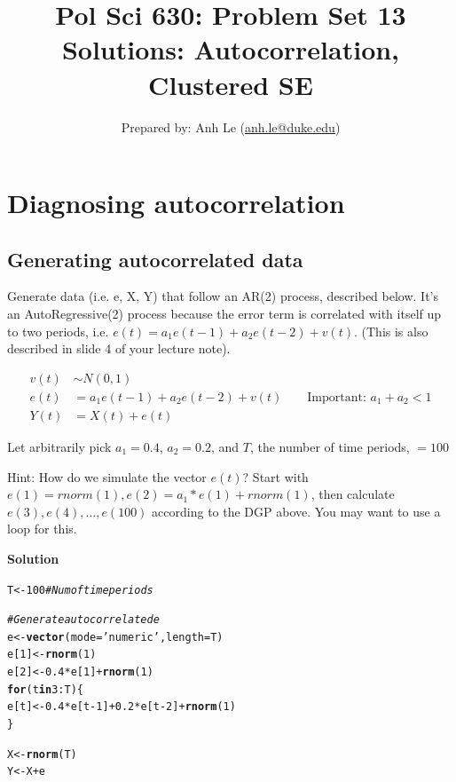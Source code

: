 \documentclass{article}\usepackage[]{graphicx}\usepackage[]{color}
\makeatletter
\newcommand{\hlnum}[1]{\textcolor[rgb]{0.686,0.059,0.569}{#1}}%
\newcommand{\hlstr}[1]{\textcolor[rgb]{0.192,0.494,0.8}{#1}}%
\newcommand{\hlcom}[1]{\textcolor[rgb]{0.678,0.584,0.686}{\textit{#1}}}%
\newcommand{\hlopt}[1]{\textcolor[rgb]{0,0,0}{#1}}%
\newcommand{\hlstd}[1]{\textcolor[rgb]{0.345,0.345,0.345}{#1}}%
\newcommand{\hlkwa}[1]{\textcolor[rgb]{0.161,0.373,0.58}{\textbf{#1}}}%
\newcommand{\hlkwb}[1]{\textcolor[rgb]{0.69,0.353,0.396}{#1}}%
\newcommand{\hlkwc}[1]{\textcolor[rgb]{0.333,0.667,0.333}{#1}}%
\newcommand{\hlkwd}[1]{\textcolor[rgb]{0.737,0.353,0.396}{\textbf{#1}}}%
\newenvironment{kframe}{%
 \def\at@end@of@kframe{}%
 \ifinner\ifhmode%
  \def\at@end@of@kframe{\end{minipage}}%
  \begin{minipage}{\columnwidth}%
 \fi\fi%
 \def\FrameCommand##1{\hskip\@totalleftmargin \hskip-\fboxsep
 \colorbox{shadecolor}{##1}\hskip-\fboxsep
     \hskip-\linewidth \hskip-\@totalleftmargin \hskip\columnwidth}%
 \MakeFramed {\advance\hsize-\width
   \@totalleftmargin\z@ \linewidth\hsize
   \@setminipage}}%
 {\par\unskip\endMakeFramed%
 \at@end@of@kframe}
\newenvironment{knitrout}{}{} %
\makeatother
\begin{document}
\title{Pol Sci 630:  Problem Set 13 Solutions: Autocorrelation, Clustered SE}
\author{Prepared by: Anh Le (\href{mailto:anh.le@duke.edu}{anh.le@duke.edu})}
\maketitle

\section{Diagnosing autocorrelation}

\subsection{Generating autocorrelated data}

Generate data (i.e. e, X, Y) that follow an AR(2) process, described below. It's an AutoRegressive(2) process because the error term is correlated with itself up to two periods, i.e. $e(t) = a_1e(t-1) + a_2 e(t-2) + v(t)$. (This is also described in slide 4 of your lecture note).

\begin{align}
v(t) &\sim N(0, 1) \\
e(t) &= a_1e(t-1) + a_2 e(t-2) + v(t) \qquad \text{Important: $a_1 + a_2 < 1$} \\
Y(t) &= X(t) + e(t)
\end{align}

Let arbitrarily pick $a_1 = 0.4$, $a_2 = 0.2$, and $T$, the number of time periods, $= 100$

Hint: How do we simulate the vector $e(t)$? Start with $e(1) = rnorm(1), e(2) = a_1 * e(1) + rnorm(1)$, then calculate $e(3), e(4), \dots, e(100)$ according to the DGP above. You may want to use a loop for this.

\textbf{Solution}

\begin{knitrout}
\color{fgcolor}\begin{kframe}
\begin{alltt}
\hlstd{T} \hlkwb{<-} \hlnum{100} \hlcom{# Num of time periods}

\hlcom{# Generate autocorrelated e}
\hlstd{e} \hlkwb{<-} \hlkwd{vector}\hlstd{(}\hlkwc{mode} \hlstd{=} \hlstr{'numeric'}\hlstd{,} \hlkwc{length} \hlstd{= T)}
\hlstd{e[}\hlnum{1}\hlstd{]} \hlkwb{<-} \hlkwd{rnorm}\hlstd{(}\hlnum{1}\hlstd{)}
\hlstd{e[}\hlnum{2}\hlstd{]} \hlkwb{<-} \hlnum{0.4} \hlopt{*} \hlstd{e[}\hlnum{1}\hlstd{]} \hlopt{+} \hlkwd{rnorm}\hlstd{(}\hlnum{1}\hlstd{)}
\hlkwa{for} \hlstd{(t} \hlkwa{in} \hlnum{3}\hlopt{:}\hlstd{T) \{}
  \hlstd{e[t]} \hlkwb{<-} \hlnum{0.4} \hlopt{*} \hlstd{e[t} \hlopt{-} \hlnum{1}\hlstd{]} \hlopt{+} \hlnum{0.2} \hlopt{*} \hlstd{e[t} \hlopt{-} \hlnum{2}\hlstd{]} \hlopt{+} \hlkwd{rnorm}\hlstd{(}\hlnum{1}\hlstd{)}
\hlstd{\}}

\hlstd{X} \hlkwb{<-} \hlkwd{rnorm}\hlstd{(T)}
\hlstd{Y} \hlkwb{<-} \hlstd{X} \hlopt{+} \hlstd{e}
\end{alltt}
\end{kframe}
\end{knitrout}
\end{document}
